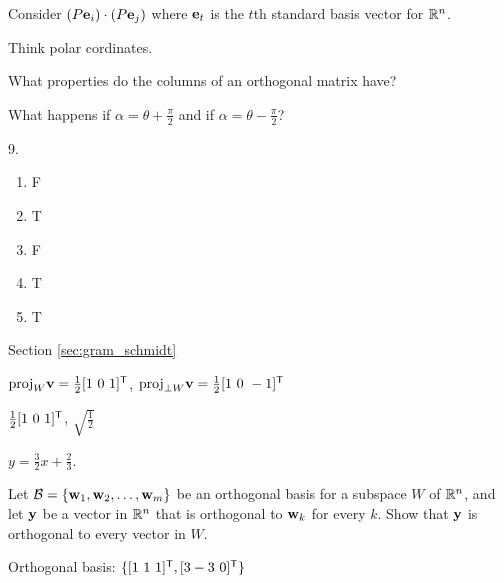 \begin{multicols}{2}
\ea

\item Consider $(P \mathbf{e}_i) \cdot (P \mathbf{e}_j)$ where $\mathbf{e}_t$ is the $t$th standard basis vector for $\mathbb{R}^n$.

\item 
\ba
\item Think polar cordinates. 

\item What properties do the columns of an orthogonal matrix have?   

\item What happens if $\alpha = \theta+\frac{\pi}{2}$ and if  $\alpha = \theta-\frac{\pi}{2}$?

\ea

\oee

\be
\item[9.]
\begin{enumerate}[label=(\alph*), leftmargin=1\parindent]	
	\item F
	\item T
	\item F  
	\item T
	\item T
	\end{enumerate}


\ee


\hspace{-0.25in} Section \ref{sec:gram_schmidt}

\obe
\item 
\ba
\item $\proj_W \vv =  \frac{1}{2} [1 \ 0 \ 1]^{\tr}$, $\text{proj}_{\perp W} \mathbf{v} =  \frac{1}{2}[1 \ 0 \ -1]^{\mathsf{T}}$

\item $ \frac{1}{2} [1 \ 0 \ 1]^{\mathsf{T}}$,  $\sqrt{\frac{1}{2}}$

\ea

\item  $y = \frac{3}{2}x + \frac{2}{3}$. 
	
\item Let $\mathcal{B} = \{\mathbf{w}_1, \mathbf{w}_2, \ldots, \mathbf{w}_m\}$ be an orthogonal basis for a subspace $W$ of $\mathbb{R}^n$, and let $\mathbf{y}$ be a vector in $\mathbb{R}^n$ that is orthogonal to $\mathbf{w}_k$ for every $k$. Show that $\mathbf{y}$ is orthogonal to every vector in $W$. 

\item 
\ba
\item Orthogonal basis: $\{[1 \ 1 \ 1]^{\tr},[3  -3 \ 0]^{\tr}\}$ 


\end{multicols}
